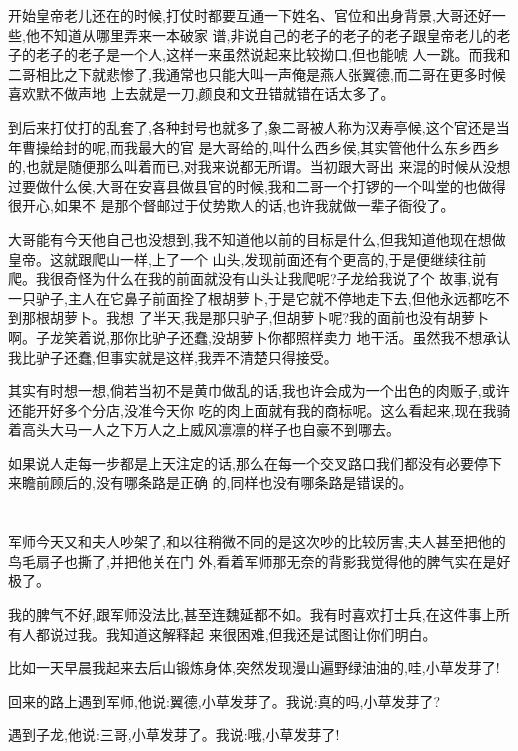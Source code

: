 ﻿\documentclass[12pt,twocolumn]{article}
\begin{document}
开始皇帝老儿还在的时候,打仗时都要互通一下姓名、官位和出身背景,大哥还好一些,他不知道从哪里弄来一本破家
谱,非说自己的老子的老子的老子跟皇帝老儿的老子的老子的老子是一个人,这样一来虽然说起来比较拗口,但也能唬
人一跳。而我和二哥相比之下就悲惨了,我通常也只能大叫一声俺是燕人张翼德,而二哥在更多时候喜欢默不做声地
上去就是一刀,颜良和文丑错就错在话太多了。

到后来打仗打的乱套了,各种封号也就多了,象二哥被人称为汉寿亭候,这个官还是当年曹操给封的呢,而我最大的官
是大哥给的,叫什么西乡侯,其实管他什么东乡西乡的,也就是随便那么叫着而已,对我来说都无所谓。当初跟大哥出
来混的时候从没想过要做什么侯,大哥在安喜县做县官的时候,我和二哥一个打锣的一个叫堂的也做得很开心,如果不
是那个督邮过于仗势欺人的话,也许我就做一辈子衙役了。

大哥能有今天他自己也没想到,我不知道他以前的目标是什么,但我知道他现在想做皇帝。这就跟爬山一样,上了一个
山头,发现前面还有个更高的,于是便继续往前爬。我很奇怪为什么在我的前面就没有山头让我爬呢?子龙给我说了个
故事,说有一只驴子,主人在它鼻子前面拴了根胡萝卜,于是它就不停地走下去,但他永远都吃不到那根胡萝卜。我想
了半天,我是那只驴子,但胡萝卜呢?我的面前也没有胡萝卜啊。子龙笑着说,那你比驴子还蠢,没胡萝卜你都照样卖力
地干活。虽然我不想承认我比驴子还蠢,但事实就是这样,我弄不清楚只得接受。

其实有时想一想,倘若当初不是黄巾做乱的话,我也许会成为一个出色的肉贩子,或许还能开好多个分店,没准今天你
吃的肉上面就有我的商标呢。这么看起来,现在我骑着高头大马一人之下万人之上威风凛凛的样子也自豪不到哪去。

如果说人走每一步都是上天注定的话,那么在每一个交叉路口我们都没有必要停下来瞻前顾后的,没有哪条路是正确
的,同样也没有哪条路是错误的。

\section{}

军师今天又和夫人吵架了,和以往稍微不同的是这次吵的比较厉害,夫人甚至把他的鸟毛扇子也撕了,并把他关在门
外,看着军师那无奈的背影我觉得他的脾气实在是好极了。

我的脾气不好,跟军师没法比,甚至连魏延都不如。我有时喜欢打士兵,在这件事上所有人都说过我。我知道这解释起
来很困难,但我还是试图让你们明白。

比如一天早晨我起来去后山锻炼身体,突然发现漫山遍野绿油油的,哇,小草发芽了!

回来的路上遇到军师,他说:翼德,小草发芽了。我说:真的吗,小草发芽了?

遇到子龙,他说:三哥,小草发芽了。我说:哦,小草发芽了!
\end{document}
